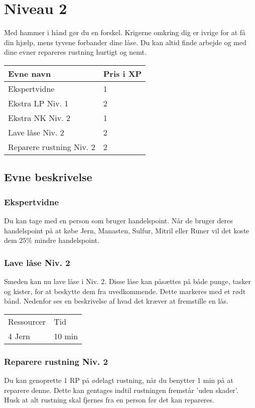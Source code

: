 \chapter{Niveau 2}
Med hammer i hånd gør du en forskel. Krigerne omkring dig er ivrige for at få din hjælp, mens tyvene forbander dine låse. Du kan altid finde arbejde og med dine evner repareres rustning hurtigt og nemt.
\begin{table}[H]
    \centering
    \begin{tabular}{|p{}|p{}|}
    \rowcolor{cerulean!80}\hline
    Evne navn & Pris i XP \\\hline
    Ekspertvidne & 1 \\\hline
    Ekstra LP Niv. 1 & 2\\\hline
    Ekstra NK Niv. 2 & 1\\\hline
    Lave låse Niv. 2 & 2\\\hline
    Reparere rustning Niv. 2 & 2\\\hline
    \end{tabular}
\end{table}
\section{Evne beskrivelse}

\subsection{Ekspertvidne}
Du kan tage med en person som bruger handelspoint. Når de bruger deres handelspoint på at købe Jern, Manasten, Sulfur, Mitril eller Runer vil det koste dem 25\% mindre handelspoint.





\subsection{Lave låse Niv. 2}
Smeden kan nu lave låse i Niv. 2. Disse låse kan påsættes på både punge, tasker og kister, for at beskytte dem fra uvedkommende. Dette markeres med et rødt bånd. Nedenfor ses en beskrivelse af hvad det kræver at fremstille en lås.\\

\begin{table}[H]
    \centering
    \begin{tabular}{|p{}|p{}|}
    \hline
    \rowcolor{cerulean!80}
    \multicolumn{2}{c}{Lås Niv. 2}\\
    \hline
    \rowcolor{cerulean!40}
         Ressourcer & Tid \\\hline
         4 Jern & 10 min\\\hline
    \end{tabular}
    \end{table}
    
\subsection{Reparere rustning Niv. 2}
Du kan genoprette 1 RP på ødelagt rustning, når du benytter 1 min på at reparere denne. Dette kan gentages indtil rustningen fremstår 'uden skader'.\\ 
Husk at alt rustning skal fjernes fra en person før det kan repareres.